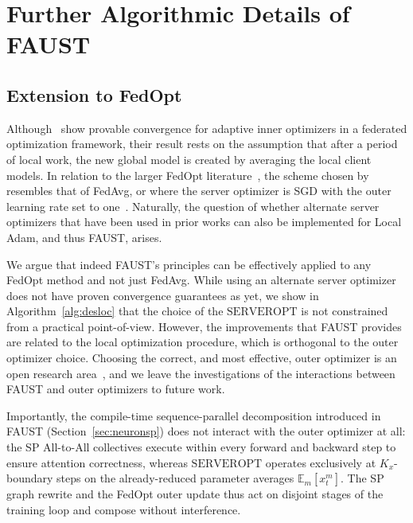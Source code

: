 \documentclass{article}
\begin{document}
\section{Further Algorithmic Details of FAUST}
\label{sec:appendix_c}

\subsection{Extension to FedOpt}
\label{sec:fedopt}

Although~\citet{cheng2025convergencedistributedadaptiveoptimization} show provable convergence for adaptive inner optimizers in a
federated optimization framework, their result rests on the assumption that after a period of local
work, the new global model is created by averaging the local client models. In relation to the larger
FedOpt literature~\citep{reddi2021adaptivefederatedoptimization}, the scheme chosen by~\citet{cheng2025convergencedistributedadaptiveoptimization} resembles
that of FedAvg, or where the server optimizer is SGD with the outer learning rate set to one~\citep{reddi2021adaptivefederatedoptimization}.
Naturally, the question of whether alternate server optimizers that have been used in prior works
can also be implemented for Local Adam, and thus FAUST, arises.

We argue that indeed FAUST's principles can be effectively applied to any FedOpt method and
not just FedAvg. While using an alternate server optimizer does not have proven convergence
guarantees as yet, we show in Algorithm~\ref{alg:desloc} that the choice of the $\mathrm{SERVEROPT}$ is not constrained
from a practical point-of-view. However, the improvements that FAUST provides are related to
the local optimization procedure, which is orthogonal to the outer optimizer choice.
Choosing the correct, and most effective, outer optimizer is an open research area~\citep{khaled2025understandingouteroptimizerslocal},
and we leave the investigations of the interactions between FAUST and outer optimizers to future work.

Importantly, the compile-time sequence-parallel decomposition introduced in FAUST
(Section~\ref{sec:neuronsp}) does not interact with the outer optimizer at all: the SP
All-to-All collectives execute within every forward and backward step to ensure attention
correctness, whereas $\mathrm{SERVEROPT}$ operates exclusively at $K_x$-boundary steps on the
already-reduced parameter averages $\mathbb{E}_m[x^m_t]$.
The SP graph rewrite and the FedOpt outer update thus act on disjoint stages of the training
loop and compose without interference.
\end{document}
